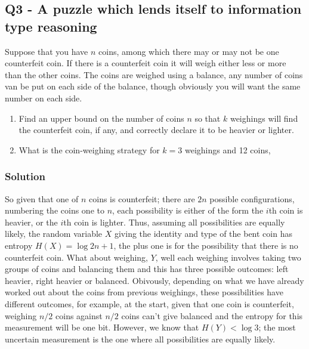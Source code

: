 \documentclass[12pt]{article}
\begin{document}
\subsection*{Q3 - A puzzle which lends itself to information type reasoning}

Suppose that you have $n$ coins, among which there may or may not be
one counterfeit coin. If there is a counterfeit coin it will weigh
either less or more than the other coins. The coins are weighed using
a balance, any number of coins van be put on each side of the balance,
though obviously you will want the same number on each side.
\begin{enumerate}
\item Find an upper bound on the number of coins $n$ so that $k$
  weighings will find the counterfeit coin, if any, and correctly
  declare it to be heavier or lighter.
\item What is the coin-weighing strategy for $k=3$ weighings and 12
  coins,
\end{enumerate}

\subsubsection*{Solution}

So given that one of $n$ coins is counterfeit; there are $2n$ possible
configurations, numbering the coins one to $n$, each possibility is
either of the form the $i$th coin is heavier, or the $i$th coin is
lighter. Thus, assuming all possibilities are equally likely, the
random variable $X$ giving the identity and type of the bent coin has
entropy $H(X)=\log{2n+1}$, the plus one is for the possibility that
there is no counterfeit coin. What about weighing, $Y$, well each
weighing involves taking two groups of coins and balancing them and
this has three possible outcomes: left heavier, right heavier or
balanced. Obivously, depending on what we have already worked out
about the coins from previous weighings, these possibilities have
different outcomes, for example, at the start, given that one coin is
counterfeit, weighing $n/2$ coins against $n/2$ coins can't give
balanced and the entropy for this measurement will be one
bit. However, we know that $H(Y)<\log{3}$; the most uncertain
measurement is the one where all possibilities are equally likely.
\end{document}
